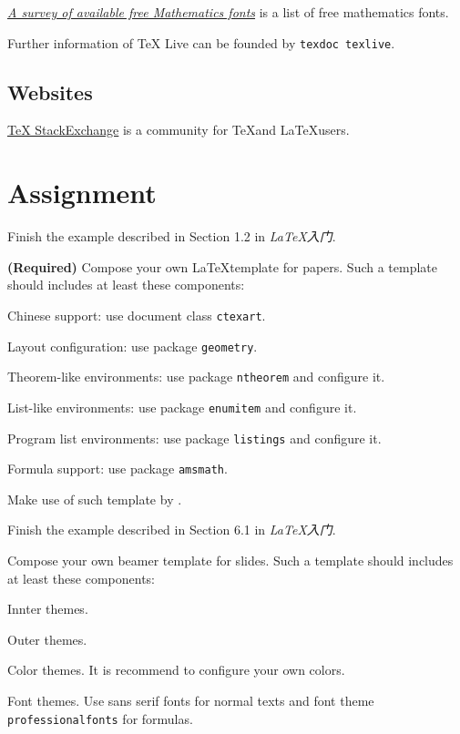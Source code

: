 \documentclass[english]{pkupaper}
\begin{document}
\href{https://www.ctan.org/pkg/free-math-font-survey}{\emph{A survey of available free Mathematics fonts}} is a list of free mathematics fonts.

Further information of TeX Live can be founded by \verb"texdoc texlive".

\subsection{Websites}

\href{https://tex.stackexchange.com/}{TeX StackExchange} is a community for \TeX and \LaTeX users.

\section{Assignment}

\begin{thmquestion}
Finish the example described in Section 1.2 in \emph{\LaTeX 入门}.
\end{thmquestion}

\begin{thmquestion}
\textbf{(Required)} Compose your own \LaTeX template for papers. Such a template should includes at least these components:
\begin{partlist}
\item Chinese support: use document class \verb"ctexart".
\item Layout configuration: use package \verb"geometry".
\item Theorem-like environments: use package \verb"ntheorem" and configure it.
\item List-like environments: use package \verb"enumitem" and configure it.
\item Program list environments: use package \verb"listings" and configure it.
\item Formula support: use package \verb"amsmath".
\end{partlist}
Make use of such template by \verb"".
\end{thmquestion}

\begin{thmquestion}
Finish the example described in Section 6.1 in \emph{\LaTeX 入门}.
\end{thmquestion}

\begin{thmquestion}
Compose your own beamer template for slides. Such a template should includes at least these components:
\begin{partlist}
\item Innter themes.
\item Outer themes.
\item Color themes. It is recommend to configure your own colors.
\item Font themes. Use sans serif fonts for normal texts and font theme \verb"professionalfonts" for formulas.
\end{partlist}
\end{thmquestion}
\end{document}
